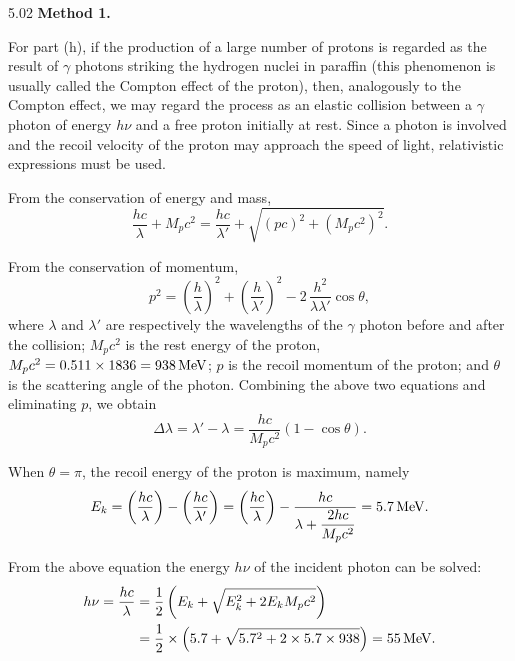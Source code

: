 \begin{solution}{5.02}
\textbf{Method 1.}

For part (h), if the production of a large number of protons is regarded as the result of
$\gamma$ photons striking the hydrogen nuclei in paraffin (this phenomenon is usually called
the Compton effect of the proton), then, analogously to the Compton effect, we may regard the
process as an elastic collision between a $\gamma$ photon of energy $h\nu$ and a free proton
initially at rest. Since a photon is involved and the recoil velocity of the proton may
approach the speed of light, relativistic expressions must be used.

From the conservation of energy and mass,
\begin{equation*}
\frac{hc}{\lambda} + M_pc^2 = \frac{hc}{\lambda'} + \sqrt{(pc)^2 + (M_pc^2)^2}.
\end{equation*}

From the conservation of momentum,
\begin{equation*}
p^2 = \left(\frac{h}{\lambda}\right)^2 + \left(\frac{h}{\lambda'}\right)^2
      - 2\,\frac{h^2}{\lambda\lambda'}\cos\theta,
\end{equation*}
where $\lambda$ and $\lambda'$ are respectively the wavelengths of the $\gamma$ photon before
and after the collision; $M_pc^2$ is the rest energy of the proton,
$M_pc^2 = 0.511\times 1836 = 938\,\mathrm{MeV}$; $p$ is the recoil momentum of the proton; and
$\theta$ is the scattering angle of the photon. Combining the above two equations and
eliminating $p$, we obtain
\begin{equation*}
\Delta\lambda = \lambda' - \lambda = \frac{hc}{M_pc^2}(1 - \cos\theta).
\end{equation*}

When $\theta = \pi$, the recoil energy of the proton is maximum, namely
\begin{equation*}
E_k = \left(\frac{hc}{\lambda}\right) - \left(\frac{hc}{\lambda'}\right)
    = \left(\frac{hc}{\lambda}\right)
      - \frac{hc}{\lambda + \dfrac{2hc}{M_pc^2}}
    = 5.7\,\mathrm{MeV}.
\end{equation*}

From the above equation the energy $h\nu$ of the incident photon can be solved:
\begin{align*}
h\nu = \frac{hc}{\lambda}
     &= \frac{1}{2}\left(E_k + \sqrt{E_k^2 + 2E_kM_pc^2}\right)\\
     &= \frac{1}{2}\times\left(5.7 + \sqrt{5.7^2 + 2\times 5.7\times 938}\right)
      = 55\,\mathrm{MeV}.
\end{align*}


\end{solution}
